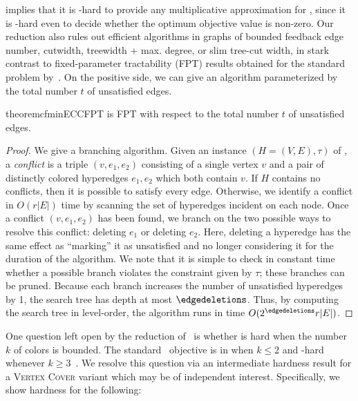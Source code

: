  implies that it is -hard to provide any multiplicative approximation for \cfmaxECC{}, since it is -hard even to decide whether the optimum objective value is non-zero.
Our reduction also rules out efficient algorithms in graphs of bounded feedback edge number, cutwidth, treewidth + max. degree, or slim tree-cut width, in stark contrast to fixed-parameter tractability (FPT) results obtained for the standard \ECC{} problem by~\citet{kellerhals2023parameterized}.
On the positive side, we can give an algorithm parameterized by the total number $t$ of unsatisfied edges.
%
\begin{restatable}{theorem}{cfminECCFPT}\label{thm:cfminecc-FPT}
    \cfminECC{} is FPT with respect to the total number $t$ of unsatisfied edges.
\end{restatable}
\begin{proof}
    We give a branching algorithm.
    Given an instance $(H = (V, E), \tau)$ of \cfminECC{}, a \emph{conflict} is a triple $(v, e_1, e_2)$ consisting of a single vertex $v$ and a pair of distinctly colored hyperedges $e_1, e_2$ which both contain $v$.
    If $H$ contains no conflicts, then it is possible to satisfy every edge.
    Otherwise, we identify a conflict in $O(r|E|)$ time by scanning the set of hyperedges incident on each node.
    Once a conflict $(v, e_1, e_2)$ has been found, we branch on the two possible ways to resolve this conflict: deleting $e_1$ or deleting $e_2$.
    Here, deleting a hyperedge has the same effect as ``marking'' it as unsatisfied and no longer considering it for the duration of the algorithm.
    We note that it is simple to check in constant time whether a possible branch violates the constraint given by $\tau$; these branches can be pruned.
    Because each branch increases the number of unsatisfied hyperedges by 1, the search tree has depth at most $\edgedeletions$.
    Thus, by computing the search tree in level-order, the algorithm runs in time $O(2^{\edgedeletions}r|E|)$.
\end{proof}
%
One question left open by the reduction of~ is whether \cfminECC{} is hard when the number~$k$ of colors is bounded.
The standard~\ECC{} objective is in  when $k \leq 2$ and -hard whenever $k \geq 3$~\cite{amburg2020clustering}.
We resolve this question via an intermediate hardness result for a \textsc{Vertex Cover} variant which may be of independent interest.
Specifically, we show hardness for the following:

